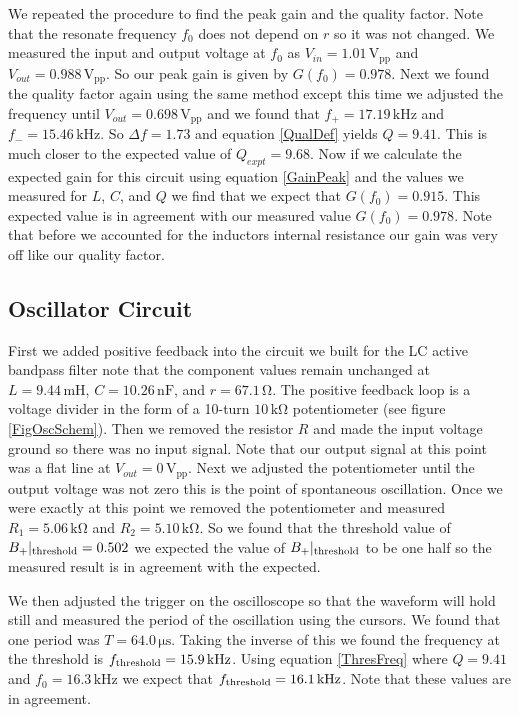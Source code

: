 \documentclass[11pt]{article}
\numberwithin{equation}{section}
\numberwithin{figure}{section}
\numberwithin{table}{section}
\newcommand{\unit}[1]{\ensuremath{\, \mathrm{#1}}}
\begin{document}
We repeated the procedure to find the peak gain and the quality factor. Note that the resonate frequency $f_0$ does not depend on $r$ so it was not changed. We measured the input and output voltage at $f_0$ as $V_{in} = 1.01\unit{V_{pp}}$ and $V_{out}=0.988\unit{V_{pp}}$. So our peak gain is given by $G(f_0) = 0.978$. Next we found the quality factor again using the same method except this time we adjusted the frequency until $V_{out} = 0.698\unit{V_{pp}}$ and we found that $f_+=17.19\unit{kHz}$ and $f_-=15.46\unit{kHz}$. So $\Delta f = 1.73$ and equation \ref{QualDef} yields $Q=9.41$. This is much closer to the expected value of $Q_{expt}=9.68$. Now if we calculate the expected gain for this circuit using equation \ref{GainPeak} and the values we measured for $L$, $C$, and $Q$ we find that we expect that $G(f_0)=0.915$. This expected value is in agreement with our measured value $G(f_0)=0.978$. Note that before we accounted for the inductors internal resistance our gain was very off like our quality factor. 

\subsection{Oscillator Circuit}
First we added positive feedback into the circuit we built for the LC active bandpass filter note that the component values remain unchanged at $L=9.44\unit{mH}$, $C=10.26\unit{nF}$, and $r=67.1\unit{\Omega}$. The positive feedback loop is a voltage divider in the form of a 10-turn $10\unit{k\Omega}$ potentiometer (see figure \ref{FigOscSchem}). Then we removed the resistor $R$ and made the input voltage ground so there was no input signal. Note that our output signal at this point was a flat line at $V_{out} = 0\unit{V_{pp}}$. Next we adjusted the potentiometer until the output voltage was not zero this is the point of spontaneous oscillation. Once we were exactly at this point we removed the potentiometer and measured $R_1 = 5.06\unit{k\Omega}$ and $R_2=5.10\unit{k\Omega}$. So we found that the threshold value of $B_+|_{\textnormal{threshold}} = 0.502$ we expected the value of $B_+|_{\textnormal{threshold}}$ to be one half so the measured result is in agreement with the expected.

We then adjusted the trigger on the oscilloscope so that the waveform will hold still and measured the period of the oscillation using the cursors. We found that one period was $T = 64.0\unit{\mu s}$. Taking the inverse of this we found the frequency at the threshold is $f_{\textnormal{threshold}} = 15.9\unit{kHz}$. Using equation \ref{ThresFreq} where $Q=9.41$ and $f_0 = 16.3\unit{kHz}$ we expect that $f_{\textnormal{threshold}} = 16.1\unit{kHz}$. Note that these values are in agreement.
\end{document}

